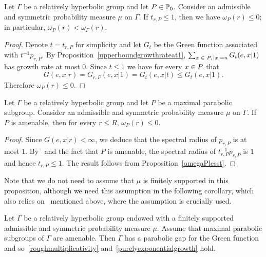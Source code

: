 \documentclass[10pt]{amsart}
\theoremstyle{definition}\newtheorem{defi}[theo]{Definition}\newtheorem{rema}[theo]{Remark}\newtheorem{exam}[theo]{Example}\newtheorem{exem}[theo]{Example}\newtheorem{nota}[theo]{Notation}
\newcommand{\bbP}{\mathbb{P}}
\let\oldin\in
\renewcommand{\in}{\mathchoice{\oldin}{\oldin}{\,\oldin\,}{\,\oldin\,}}
\begin{document}
\begin{prop}\label{omegaPlesst}
Let $\Gamma$ be a relatively hyperbolic group and let $P\in \bbP_0$. Consider an admissible and symmetric probability measure $\mu$ on $\Gamma$. If $t_{r, P} \leq 1$, then we have $\omega_P(r) \leq 0$; in particular, $\omega_P(r) < \omega_{\Gamma}(r)$.
\end{prop}

\begin{proof}
Denote $t = t_{r, P}$ for simplicity and let $G_t$ be the Green function associated with $t^{-1} p_{r, P}$. By Proposition~\ref{upperboundgrowthrateat1}, $\sum_{x \in P, \, |x| = n} G_t(e, x | 1)$ has growth rate at most 0. Since $t \leq 1$ we have for every $x\in P$ that
\[
G(e, x | r) = G_{r, P}(e, x | 1) = G_t(e, x | t) \leq G_t(e, x | 1).
\]
Therefore $\omega_P(r) \leq 0$.
\end{proof}

\begin{prop}\label{propamenableparabolic}
Let $\Gamma$ be a relatively hyperbolic group and let $P$ be a maximal parabolic subgroup. Consider an admissible and symmetric probability measure $\mu$ on $\Gamma$. If $P$ is amenable, then for every $r\leq R$, $\omega_P(r)\leq 0$.
\end{prop}



\begin{proof}
Since $G(e, x | r) < \infty$, we deduce that the spectral radius of $p_{r, P}$ is at most $1$. By~\cite[Corollary~12.5]{Woessbook} and the fact that $P$ is amenable, the spectral radius of $t_{r, P}^{-1} p_{r, P}$ is $1$ and hence $t_{r, P} \leq 1$. The result follows from Proposition~\ref{omegaPlesst}.
\end{proof}

Note that we do not need to assume that $\mu$ is finitely supported in this proposition, although we need this assumption in the following corollary, which also relies on~\cite[Theorem~1.8]{DWY} mentioned above, where the assumption is crucially used.

\begin{coro}\label{coramenableparabolic}
Let $\Gamma$ be a relatively hyperbolic group endowed with a finitely supported admissible and symmetric probability measure $\mu$. Assume that maximal parabolic subgroups of $\Gamma$ are amenable. Then $\Gamma$ has a parabolic gap for the Green function and so~\eqref{roughmultiplicativity} and~\eqref{purelyexponentialgrowth} hold.
\end{coro}
\end{document}
